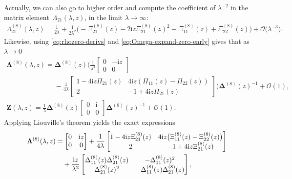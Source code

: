 \documentclass[pdftex]{sigma}
\numberwithin{equation}{section}
\newcommand{\ii}{\mathrm{i}}
\begin{document}
Actually, we can also go to higher order and compute the coefficient of $\lambda^{-2}$ in the matrix element~$\Lambda_{21}(\lambda,z)$,
in the limit $\lambda\to\infty$:
\begin{align}
\Lambda_{21}^{(8)}(\lambda,z)=\frac{1}{2\lambda} +\frac{1}{2\lambda^2}\bigl(-\Xi_{21}^{(8)}(z)-{2\ii z}{}\Xi_{21}^{(8)}(z)^2-\Xi_{11}^{(8)}(z)+\Xi_{22}^{(8)}(z)\bigr)
+\mathcal{O}\big(\lambda^{-3}\big).
 \label{eq:Lambda21-higher-order}
\end{align}
Likewise, using \eqref{eq:rhozero-derivs} and \eqref{eq:Omega-expand-zero-early} gives that as $\lambda \to 0$
\begin{gather}
 \mathbf{\Lambda}^{(8)}(\lambda,z)=\mathbf{\Delta}^{(8)}(z)\Bigg(\frac{1}{\lambda^2}\begin{bmatrix}0&{-\ii z}{} \\0&0\end{bmatrix}\nonumber \\ \phantom{\mathbf{\Lambda}^{(8)}(\lambda,z)=}{}-\frac{1}{4\lambda}\begin{bmatrix}1-{4\ii z}\Pi_{21}(z)&{4\ii z}{}(\Pi_{11}(z)-\Pi_{22}(z))\\2&-1+{4\ii z}\Pi_{21}(z)\end{bmatrix}\Bigg)\mathbf{\Delta}^{(8)}(z)^{-1}
+ \mathcal{O}(1),\nonumber
 \\
 \mathbf{Z}(\lambda,z)=\frac{1}{\lambda}\mathbf{\Delta}^{(8)}(z)\begin{bmatrix}0&{\ii}{} \\0&0\end{bmatrix}\mathbf{\Delta}^{(8)}(z)^{-1} + \mathcal{O}(1).
\label{eq:Lax-coefficients-zero}
\end{gather}
Applying Liouville's theorem yields the exact expressions
\begin{align}
 & \mathbf{\Lambda}^{(8)}(\lambda,z)= \begin{bmatrix}0&{\ii z}{} \\0&0\end{bmatrix} +\frac{1}{4\lambda}\begin{bmatrix}1-{4\ii z}\Xi^{(8)}_{21}(z) & {4\ii z}{}\big(\Xi^{(8)}_{11}(z)-\Xi^{(8)}_{22}(z)\big) \\ 2 &-1 +{4\ii z}{}\Xi^{(8)}_{21}(z)\end{bmatrix}\nonumber
 \\
 &\hphantom{\mathbf{\Lambda}^{(8)}(\lambda,z)= }{}
 +\frac{\ii z}{\lambda^2}\begin{bmatrix}\Delta^{(8)}_{11}(z)\Delta^{(8)}_{21}(z) & -\Delta^{(8)}_{11}(z)^2 \\
 \Delta^{(8)}_{21}(z)^2 & -\Delta^{(8)}_{11}(z)\Delta^{(8)}_{21}(z)\end{bmatrix},
\label{eq:Lambda-exact}
\end{align}
\end{document}
